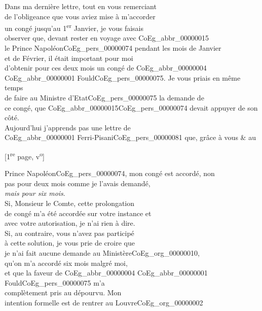 \documentclass{book}
\begin{document}
{Dans ma dernière lettre, tout en vous remerciant\\
de l’obligeance que vous aviez mise à m’accorder\\
un congé jusqu’au 1\textsuperscript{er} Janvier, je vous faisais\\
observer que, devant rester en voyage avec \gls{CoEg_abbr_00000015}\\
le Prince Napoléon\gls{CoEg_pers_00000074} pendant les mois de Janvier\\
et de Février, il était important pour moi\\
d’obtenir pour ces deux mois un congé de \gls{CoEg_abbr_00000004}\\
\gls{CoEg_abbr_00000001} Fould\gls{CoEg_pers_00000075}. Je vous priais en même temps\\
de faire au Ministre d’Etat\gls{CoEg_pers_00000075} la demande de\\
ce congé, que \gls{CoEg_abbr_00000015}\gls{CoEg_pers_00000074} devait appuyer de son\\
côté.\\
\indent Aujourd’hui j’apprends pas une lettre de\\
\gls{CoEg_abbr_00000001} Ferri-Pisani\gls{CoEg_pers_00000081} que, grâce à vous \& au
{\footnotesize \begin{center} [1\textsuperscript{re} page, v\textsuperscript{o}]\end{center}}
\noindent Prince Napoléon\gls{CoEg_pers_00000074}, mon congé est accordé, non\\
pas pour deux mois comme je l’avais demandé,\\
\textit{mais pour six mois}.\\
\indent Si, Monsieur le Comte, cette prolongation\\
de congé m’a été accordée sur votre instance et\\
avec votre autorisation, je n’ai rien à dire.\\
Si, au contraire, vous n’avez pas participé\\
à cette solution, je vous prie de croire que\\
je n’ai fait aucune demande au Ministère\gls{CoEg_org_00000010},\\
qu’on m’a accordé six mois malgré moi,\\
et que la faveur de \gls{CoEg_abbr_00000004} \gls{CoEg_abbr_00000001} Fould\gls{CoEg_pers_00000075} m’a\\
complètement pris au dépourvu. Mon\\
intention formelle est de rentrer au Louvre\gls{CoEg_org_00000002}\\
}
\end{document}
